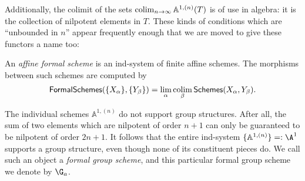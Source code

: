 Additionally, the colimit of the sets $\operatorname*{colim}_{n \to \infty} \mathbb A^{1,(n)}(T)$ is of use in algebra: it is the collection of nilpotent elements in $T$.  These kinds of conditions which are ``unbounded in $n$'' appear frequently enough that we are moved to give these functors a name too:
\begin{definition}
An \textit{affine formal scheme} is an ind-system of finite affine schemes.    The morphisms between such schemes are computed by \[\mathsf{FormalSchemes}(\{X_\alpha\}, \{Y_\beta\}) = \lim_\alpha \operatorname*{colim}_\beta \mathsf{Schemes}(X_\alpha, Y_\beta).\]
\end{definition}



\begin{example}\label{FormalGaExample}
The individual schemes $\mathbb A^{1, (n)}$ do not support group structures.  After all, the sum of two elements which are nilpotent of order $n+1$ can only be guaranteed to be nilpotent of order $2n+1$.  It follows that the entire ind-system $\{\mathbb A^{1, (n)}\} =: \A^1$ supports a group structure, even though none of its constituent pieces do.  We call such an object a \textit{formal group scheme}, and this particular formal group scheme we denote by $\G_a$.
\end{example}


